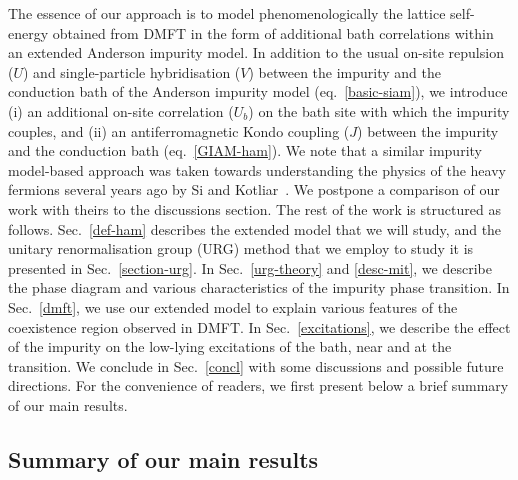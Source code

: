 \documentclass{iopart}
\begin{document}
The essence of our approach is to model phenomenologically the lattice self-energy obtained from DMFT in the form of additional bath correlations within an extended Anderson impurity model.
In addition to the usual on-site repulsion ($U$) and single-particle hybridisation ($V$) between the impurity and the conduction bath of the Anderson impurity model (eq.~\eqref{basic-siam}), we introduce (i) an additional on-site correlation ($U_{b}$) on the bath site with which the impurity couples, and (ii) an antiferromagnetic Kondo coupling ($J$) between the impurity and the conduction bath (eq.~\eqref{GIAM-ham}). 
We note that a similar impurity model-based approach was taken towards understanding the physics of the heavy fermions several years ago by Si and Kotliar~\cite{si_kotliar_1993,kotliarsi_1993}. 
We postpone a comparison of our work with theirs to the discussions section. The rest of the work is structured as follows. Sec.~\eqref{def-ham} describes the extended model that we will study, and the unitary renormalisation group (URG) method that we employ to study it is presented in Sec.~\eqref{section-urg}. In Sec.~\eqref{urg-theory} and \eqref{desc-mit}, we describe the phase diagram and various characteristics of the impurity phase transition. In Sec.~\eqref{dmft}, we use our extended model to explain various features of the coexistence region observed in DMFT. In Sec.~\eqref{excitations}, we describe the effect of the impurity on the low-lying excitations of the bath, near and at the transition. We conclude in Sec.~\eqref{concl} with some discussions and possible future directions. For the convenience of readers, we first present below a brief summary of our main results.

\subsection*{\bf Summary of our main results}
\end{document}
